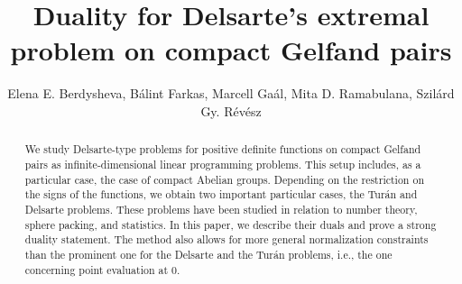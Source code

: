 \documentclass[[a4paper,english,12pt]{amsart}
\theoremstyle{plain}
\theoremstyle{remark}
\begin{document}

\title{Duality for Delsarte's extremal problem on compact Gelfand pairs}

\author[Berdysheva at al.]{Elena E. Berdysheva, B\'alint Farkas, Marcell Ga\'al, Mita D. Ramabulana, Szil\'ard Gy. R\'ev\'esz}


\address{Elena E. Berdysheva
\newline  \indent University of Cape Town,
\newline  \indent South Africa}



\address{B\'alint Farkas
\newline  \indent University of Wuppertal
\newline  \indent Gau{\ss}stra{\ss}e 20, 42119 Wuppertal, Germany}



\address{Mita D. Ramabulana
\newline  \indent University of Cape Town,
\newline  \indent South Africa}



\address{Szil\'ard Gy. R\'evesz
\newline  \indent HUN-REN R\'enyi Institute of Mathematics,
\newline \indent Budapest, Re\'altanoda utca 13-15,1053 HUNGARY}




\maketitle

\begin{abstract}
 We study Delsarte-type problems for positive definite functions on compact Gelfand pairs as infinite-dimensional linear programming problems. This setup includes, as a particular case, the case of compact Abelian groups. Depending on the restriction on the signs of the functions, we obtain two important particular cases, the Tur\'an and Delsarte problems. These problems have been studied in relation to number theory, sphere packing, and statistics. In this paper, we describe their duals and prove a strong duality statement. The  method also allows for more general normalization constraints than the prominent one for the Delsarte and the Tur\'an problems, i.e., the one concerning point evaluation at $0$.
\end{abstract}
\end{document}
